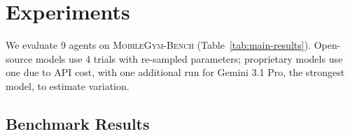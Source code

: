 \documentclass[11pt]{article}
\newcommand{\bench}{\textsc{MobileGym-Bench}}
\begin{document}
\section{Experiments}\label{sec:exp}

We evaluate 9 agents on \bench{} (Table~\ref{tab:main-results}). Open-source models use 4 trials with re-sampled parameters; proprietary models use one due to API cost, with one additional run for Gemini 3.1 Pro, the strongest model, to estimate variation.

\subsection{Benchmark Results}\label{sec:exp:bench}
\end{document}
